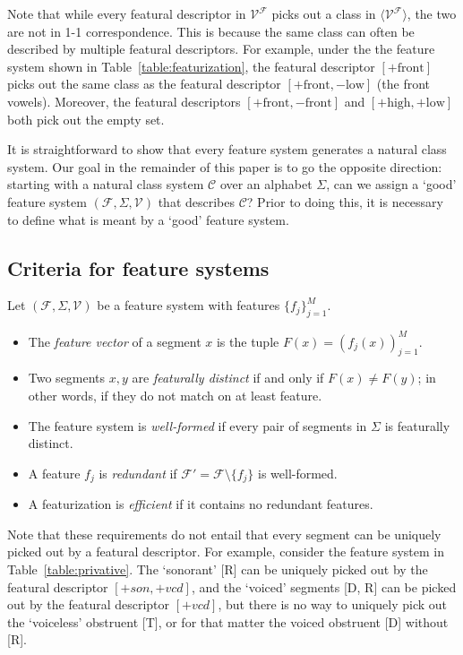 \documentclass[11pt, oneside]{article}   	%
\begin{document}
Note that while every featural descriptor in $\mathcal V^\mathcal F$ picks out a class in $\langle \mathcal V^\mathcal F \rangle$, the two are not in 1-1 correspondence. This is because the same class can often be described by multiple featural descriptors. For example, under the the feature system shown in Table~\ref{table:featurization}, the featural descriptor $[+\text{front}]$ picks out the same class as the featural descriptor $[+ \text{front}, - \text{low}]$ (the front vowels). Moreover, the featural descriptors $[+\text{front}, -\text{front}]$ and $[+\text{high}, +\text{low}]$ both pick out the empty set.

\vspace{\baselineskip} It is straightforward to show that every feature system generates a natural class system. Our goal in the remainder of this paper is to go the opposite direction: starting with a natural class system $\mathcal C$ over an alphabet $\Sigma$, can we assign a `good' feature system $(\mathcal F, \Sigma, \mathcal V)$ that describes $\mathcal C$? Prior to doing this, it is necessary to define what is meant by a `good' feature system.

\subsection{Criteria for feature systems}

 Let $(\mathcal F, \Sigma, \mathcal V)$ be a feature system with features $\{f_j\}_{j=1}^M$. \begin{itemize}
    \item The \textit{feature vector} of a segment $x$ is the tuple $F(x) = (f_j(x))_{j=1}^M$.
    \item Two segments $x, y$ are \textit{featurally distinct} if and only if $F(x) \neq F(y)$; in other words, if they do not match on at least feature.
    \item The feature system is \textit{well-formed} if every pair of segments in $\Sigma$ is featurally distinct.
    \item A feature $f_j$ is \textit{redundant} if $\mathcal F' = \mathcal F \setminus \{ f_j \}$ is well-formed.
    \item A featurization is \textit{efficient} if it contains no redundant features.
    \end{itemize}

Note that these requirements do not entail that every segment can be uniquely picked out by a featural descriptor. For example, consider the feature system in Table~\ref{table:privative}. The `sonorant' [R] can be uniquely picked out by the featural descriptor $[+son,+vcd]$, and the `voiced' segments [D, R] can be picked out by the featural descriptor $[+vcd]$, but there is no way to uniquely pick out the `voiceless' obstruent [T], or for that matter the voiced obstruent [D] without [R].
\end{document}
